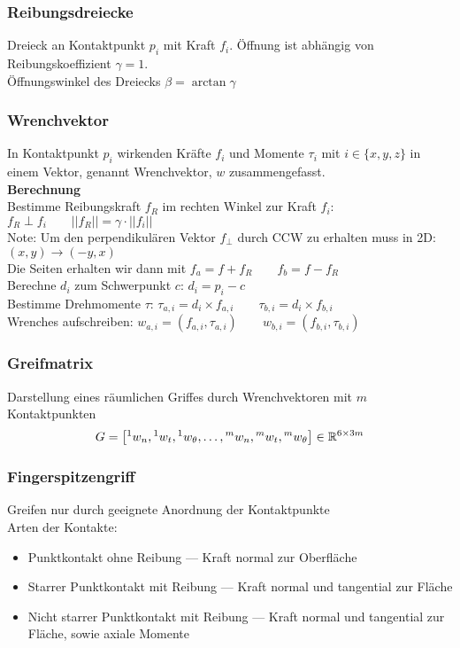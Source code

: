 \subsubsection{Reibungsdreiecke}%
\label{gpl:ssub:reibungsdreiecke}
Dreieck an Kontaktpunkt \(p_i\) mit Kraft \(f_i\). Öffnung ist abhängig von Reibungskoeffizient \(\gamma = 1\).\\
Öffnungswinkel des Dreiecks \(\beta = \arctan \gamma\)

\subsubsection{Wrenchvektor}%
\label{gpl:ssub:wrenchvektor}
In Kontaktpunkt \(p_i\) wirkenden Kräfte \(f_i\) und Momente \(\tau_i\) mit \(i \in \{x, y, z\}\) in einem Vektor,
genannt Wrenchvektor, \(w\) zusammengefasst.\\

\textbf{Berechnung}\\
Bestimme Reibungskraft \(f_R\) im rechten Winkel zur Kraft \(f_i\): \(f_R \perp f_i \qquad ||f_R|| = \gamma \cdot ||f_i||\)\\
Note: Um den perpendikulären Vektor \(f_{\perp}\) durch CCW zu erhalten muss in 2D: \((x, y) \rightarrow (-y, x)\)\\
Die Seiten erhalten wir dann mit \(f_a = f + f_R \qquad f_b = f - f_R\)\\
Berechne \(d_i\) zum Schwerpunkt \(c\): \(d_i = p_i - c\)\\
Bestimme Drehmomente \(\tau\): \(\tau_{a,i} = d_i \times f_{a,i} \qquad \tau_{b,i} = d_i \times f_{b,i}\)\\
Wrenches aufschreiben: \(w_{a,i} = (f_{a,i}, \tau_{a,i}) \qquad w_{b,i} = (f_{b,i}, \tau_{b, i})\)\\
\subsubsection{Greifmatrix}%
\label{gpl:ssub:greifmatrix}
Darstellung eines räumlichen Griffes durch Wrenchvektoren mit \(m\) Kontaktpunkten
\[G = \left[ {}^1w_n, {}^1w_t, {}^1w_{\theta}, \ldots, {}^mw_n, {}^mw_t, {}^mw_{\theta}\right] \in \mathbb{R}^{6\times3m}\]

\subsubsection{Fingerspitzengriff}%
\label{gpl:ssub:fingerspitzengriff}
Greifen nur durch geeignete Anordnung der Kontaktpunkte\\
Arten der Kontakte:
\begin{itemize}
\item Punktkontakt ohne Reibung --- Kraft normal zur Oberfläche
\item Starrer Punktkontakt mit Reibung --- Kraft normal und tangential zur Fläche
\item Nicht starrer Punktkontakt mit Reibung --- Kraft normal und tangential zur Fläche, sowie axiale Momente
\end{itemize}

